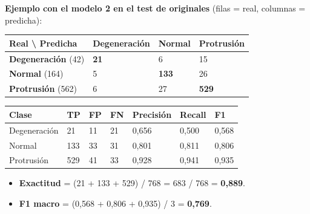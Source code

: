 \begin{center}
\end{center}

\begin{center}
\end{center}

\textbf{Ejemplo con el modelo 2 en el test de originales} (filas = real, columnas = predicha):

\begin{table}[htbp]
\centering\small
\begin{tabular}{llll}
\toprule
Real \textbackslash{} Predicha & Degeneración & Normal & Protrusión \\
\midrule
\textbf{Degeneración} (42) & \textbf{21} & 6 & 15 \\
\textbf{Normal} (164) & 5 & \textbf{133} & 26 \\
\textbf{Protrusión} (562) & 6 & 27 & \textbf{529} \\
\bottomrule
\end{tabular}
\end{table}


\begin{table}[htbp]
\centering\small
\begin{tabular}{lllllll}
\toprule
Clase & TP & FP & FN & Precisión & Recall & F1 \\
\midrule
Degeneración & 21 & 11 & 21 & 0,656 & 0,500 & 0,568 \\
Normal & 133 & 33 & 31 & 0,801 & 0,811 & 0,806 \\
Protrusión & 529 & 41 & 33 & 0,928 & 0,941 & 0,935 \\
\bottomrule
\end{tabular}
\end{table}

\begin{itemize}
  \item \textbf{Exactitud} = (21 + 133 + 529) / 768 = 683 / 768 = \textbf{0,889}.
  \item \textbf{F1 macro} = (0,568 + 0,806 + 0,935) / 3 = \textbf{0,769}.
\end{itemize}

